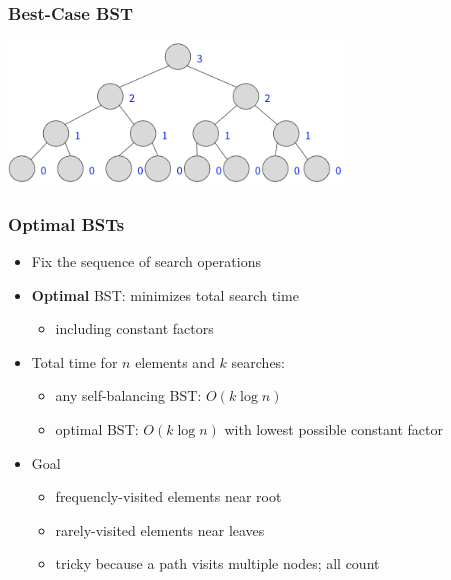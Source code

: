 \documentclass{beamer}
\begin{document}
\begin{frame} \frametitle{Best-Case BST}
  \begin{center}
    \includegraphics[height=1.5in]{bst_balanced.png}
  \end{center}
\end{frame}

\begin{frame} \frametitle{Optimal BSTs}
  \begin{itemize}
    \item Fix the sequence of search operations
    \item \textbf{Optimal} BST: minimizes total search time
      \begin{itemize}
        \item including constant factors
      \end{itemize}
    \item Total time for $n$ elements and $k$ searches:
      \begin{itemize}
        \item any self-balancing BST: $O(k \log n)$
        \item optimal BST: $O(k \log n)$ with lowest possible constant factor
      \end{itemize}
    \item Goal
      \begin{itemize}
        \item frequencly-visited elements near root
        \item rarely-visited elements near leaves
        \item tricky because a path visits multiple nodes; all count
      \end{itemize}
  \end{itemize}
\end{frame}
\end{document}
